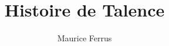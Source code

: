 \documentclass[a4paper,11pt]{book}
\begin{document}
\title{Histoire de Talence}
\author{Maurice Ferrus}
\frontmatter
\maketitle

\mainmatter{}
\tableofcontents{}

\end{document}
